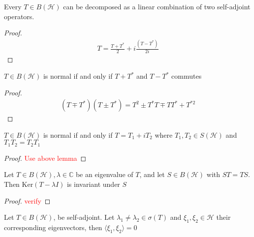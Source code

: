 

\begin{lemma}
  Every $T \in B(\mathcal{H})$ can be decomposed as a linear combination of two
  self-adjoint operators.
\end{lemma}
\begin{proof}
  \begin{align*}
    T = \frac{T+T^*}{2} + i \frac{(T-T^*)}{2i}
  \end{align*}
\end{proof}

\begin{lemma}
  $T \in B(\mathcal{H})$ is normal if and only if $T + T^*$ and $T
  - T^*$ commutes
\end{lemma}
\begin{proof}
  \begin{align*}
    (T \mp T^*)( T \pm T^*) = T^2 \pm T^*T \mp TT^* + T^{*2}
  \end{align*}
\end{proof}

\begin{lemma}
  $T \in B(\mathcal{H})$ is normal if and only if $T = T_1 + i T_2$
  where $T_{1}, T_{2} \in S(\mathcal{H})$ and $T_{1}T_{2} = T_{2}T_1$
\end{lemma}
\begin{proof}
  \textcolor{red}{Use above lemma}
\end{proof}

\begin{lemma}
  Let $T \in B(\mathcal{H}), \lambda \in \mathbb{C}$ be an eigenvalue
  of $T$, and let $ S \in B(\mathcal{H})$ with $ST = TS$. Then $
  \textrm{Ker}(T - \lambda I)$ is invariant under $S$
\end{lemma}
\begin{proof}
  \textcolor{red}{verify}
\end{proof}

\begin{lemma}
  Let $T \in B(\mathcal{H})$, be self-adjoint. Let $\lambda_1 \neq
  \lambda_2 \in \sigma(T)$ and $\xi_1, \xi_2 \in \mathcal{H}$ their
  corresponding eigenvectors, then $ \langle \xi_1 , \xi_2 \rangle = 0$
\end{lemma}

